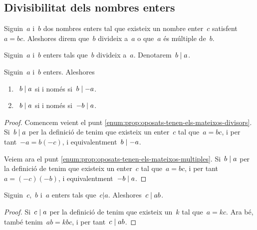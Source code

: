 \documentclass[../../main.tex]{subfiles}
\begin{document}
    \subsection{Divisibilitat dels nombres enters}
    \begin{definition}
        \label{def:divisor-Z}
        \label{def:multiple-Z}
        Siguin~\(a\) i~\(b\) dos nombres enters tal que existeix un nombre enter~\(c\) satisfent~\(a=bc\).
        Aleshores direm que~\(b\) divideix a~\(a\) o que~\(a\) és múltiple de~\(b\).
    \end{definition}
    \begin{notation}
        Siguin~\(a\) i~\(b\) enters tals que~\(b\) divideix a~\(a\).
        Denotarem~\(b\mathrel{|} a\).
    \end{notation}
    \begin{proposition}
        \label{prop:oposats-tenen-els-mateixos-divisors}
        \label{prop:oposats-tenen-els-mateixos-multiples}
        Siguin~\(a\) i~\(b\) enters.
        Aleshores
        \begin{enumerate}
            \item\label{enum:prop:oposats-tenen-els-mateixos-divisors}~\(b\mathrel{|} a\) si i només si~\(b\mathrel{|}-a\).
            \item\label{enum:prop:oposats-tenen-els-mateixos-multiples}~\(b\mathrel{|} a\) si i només si~\(-b\mathrel{|} a\).
        \end{enumerate}
    \end{proposition}
    \begin{proof}
        Comencem veient el punt \eqref{enum:prop:oposats-tenen-els-mateixos-divisors}.
        Si~\(b\mathrel{|} a\) per la definició de  tenim que existeix un enter~\(c\) tal que~\(a=bc\), i per tant~\(-a=b(-c)\), i equivalentment~\(b\mathrel{|}-a\).

        Veiem ara el punt \eqref{enum:prop:oposats-tenen-els-mateixos-multiples}.
        Si~\(b\mathrel{|} a\) per la definició de  tenim que existeix un enter~\(c\) tal que~\(a=bc\), i per tant~\(a=(-c)(-b)\), i equivalentment~\(-b\mathrel{|} a\).
    \end{proof}
    \begin{proposition}
        \label{prop:divisors-divideixen-el-divident-escalat}
        Siguin~\(c\),~\(b\) i~\(a\) enters tals que~\(c|a\).
        Aleshores~\(c\mathrel{|} ab\).
    \end{proposition}
    \begin{proof}
        Si~\(c\mathrel{|} a\) per la definició de  tenim que existeix un~\(k\) tal que~\(a=kc\).
        Ara bé, també tenim~\(ab=kbc\), i per tant~\(c\mathrel{|} ab\).
    \end{proof}
\end{document}
